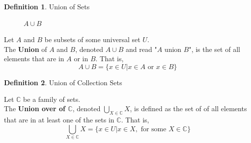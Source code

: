 \documentclass{book}
\theoremstyle{definition}
\newtheorem{definition}{Definition}[section]
\theoremstyle{remark}
\newcommand{\bb}[1]{\mathbb{#1}}
\begin{document}
\newpage
\begin{definition}
Union of Sets \\

\begin{figure}[H]
    \centering
        \def \setA{ (0,0) circle (1cm) }
        \def \setB{ (1.5,0) circle (1cm) }
        \def \myrectangle{ (-2, -1.5) rectangle (3.5, 1.5) }
            \begin{center}
            \end{center}
    \caption{$A \cup B$}
    \label{fig:AcupB}
\end{figure}

\begin{tcolorbox}
    Let $A$ and $B$ be subsets of some universal set $U$. \\

    The \textbf{Union} of $A$ and $B$, denoted $A \cup B$ and read "$A$ union $B$", is the set  of all elements that are in $A$ or in $B$. That is,
     \begin{equation*}
            A \cup B = \{x \in U | x \in A \text{ or } x \in B \}
        \end{equation*}
\end{tcolorbox}

\end{definition}

\begin{definition}
Union of Collection Sets \\

\begin{tcolorbox}
    Let $\bb{C}$ be a family of sets. \\
    The \textbf{Union over of $\bb{C}$}, denoted $\bigcup_{X \in \bb{C}}{X}$, is defined as the set of of all elements that are in at least one of the sets in $\bb{C}$. That is,  
        \begin{equation*}
            \bigcup_{X \in \bb{C}}{X} = \{x \in U | x \in X, \text{ for some } X \in \bb{C} \}
        \end{equation*}
\end{tcolorbox}
\end{definition}
\end{document}
